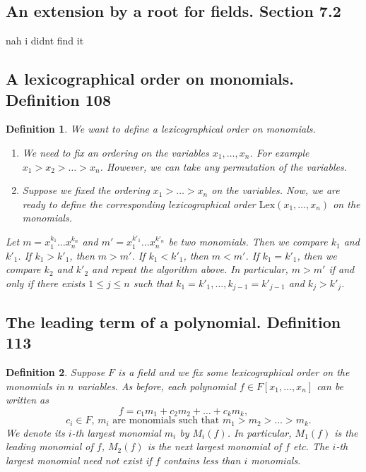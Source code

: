 \documentclass{article}
\newtheorem*{customdefinition}{Definition}
\begin{document}
\subsection*{An extension by a root for fields. Section 7.2}
nah i didnt find it

\subsection*{A lexicographical order on monomials. Definition 108}
\begin{customdefinition}
We want to define a lexicographical order on monomials.
\begin{enumerate}
    \item We need to fix an ordering on the variables \(x_1, \ldots, x_n\). For example \(x_1 > x_2 > \ldots > x_n\). However, we can take any permutation of the variables.
    \item Suppose we fixed the ordering \(x_1 > \ldots > x_n\) on the variables. Now, we are ready to define the corresponding lexicographical order \(\text{Lex}(x_1, \ldots, x_n)\) on the monomials.
\end{enumerate}
Let \(m = x_1^{k_1} \ldots x_n^{k_n}\) and \(m' = x_1^{k'_1} \ldots x_n^{k'_n}\) be two monomials. Then we compare \(k_1\) and \(k'_1\). If \(k_1 > k'_1\), then \(m > m'\). If \(k_1 < k'_1\), then \(m < m'\). If \(k_1 = k'_1\), then we compare \(k_2\) and \(k'_2\) and repeat the algorithm above. In particular, \(m > m'\) if and only if there exists \(1 \leq j \leq n\) such that \(k_1 = k'_1, \ldots, k_{j-1} = k'_{j-1}\) and \(k_j > k'_j\).
\end{customdefinition}

\subsection*{The leading term of a polynomial. Definition 113}
\begin{customdefinition}
Suppose \(F\) is a field and we fix some lexicographical order on the monomials in \(n\) variables. As before, each polynomial \(f \in F[x_1, \ldots, x_n]\) can be written as
\[
f = c_1 m_1 + c_2 m_2 + \ldots + c_k m_k,
\]
\[
\quad c_i \in F, \, m_i \text{ are monomials such that } m_1 > m_2 > \ldots > m_k.
\]
We denote its \(i\)-th largest monomial \(m_i\) by \(M_i(f)\). In particular, \(M_1(f)\) is the leading monomial of \(f\), \(M_2(f)\) is the next largest monomial of \(f\) etc. The \(i\)-th largest monomial need not exist if \(f\) contains less than \(i\) monomials.
\end{customdefinition}
\end{document}
